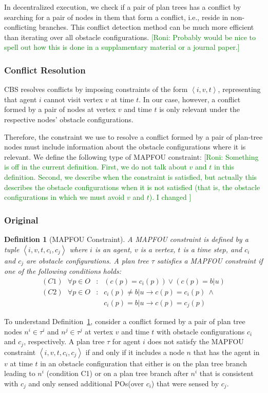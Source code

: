 \documentclass[letterpaper]{article} %
\newcommand{\unknown}{\textit{b}|\textit{u}}
\newcommand{\pos}{POs\xspace}
\newcommand{\tuple}[1]{\ensuremath{\left \langle #1 \right \rangle }}
\newcommand{\roni}[1]{{\textcolor{green}{[Roni: #1]}}}
\newtheorem{definition}{Definition}
\begin{document}
In decentralized execution, we check if a pair of plan trees has a conflict by searching for a pair of nodes in them that form a conflict, i.e., reside in non-conflicting branches. 
This conflict detection method can be much more efficient than iterating over all obstacle configurations. 
\roni{Probably would be nice to spell out how this is done in a supplamentary material or a journal paper.}

\subsubsection{Conflict Resolution}
\label{scn:conflicts-resolution}
CBS resolves conflicts by imposing constraints of the form $\tuple{i,v,t}$, representing that agent $i$ cannot visit vertex $v$ at time $t$. In our case, however, a conflict formed by a pair of nodes  at vertex $v$ and time $t$ is only relevant under the respective nodes' obstacle configurations. 

Therefore, the constraint we use to resolve a conflict formed by a pair of plan-tree nodes must include  information about the obstacle configurations where it is relevant.  
We define the following type of MAPFOU constraint:
\roni{Something is off in the current definition. First, we do not talk about $v$ and $t$ in this definition. Second, we describe when the constraint is satisfied, but actually this describes the obstacle configurations when it is not satisfied (that is, the obstacle configurations in which we must avoid $v$ and $t$). I changed }
\subsubsection{Original} 
\begin{definition}[MAPFOU Constraint]
A MAPFOU constraint is defined by a tuple $\tuple{i,v,t,c_i,c_j}$ 
where $i$ is an agent, 
$v$ is a vertex,
$t$ is a time step, 
and $c_i$ and $c_j$ are obstacle configurations. 
A plan tree $\tau$ satisfies a MAPFOU constraint if one of the following conditions holds:
\begin{eqnarray}
(C1) ~~~ \forall p\in O&:& \left(c(p)=c_i(p)\right)\vee \left(c(p)=\unknown\right) \\
(C2) ~~~ \forall p\in O&:& c_i(p)\neq\unknown \rightarrow c(p)=c_i(p) ~ \wedge  \\
 &&   c_i(p)=\unknown \rightarrow c(p)=c_j(p)
\end{eqnarray}
\label{def:mapfou-constraint}
\end{definition}
To understand Definition~\ref{def:mapfou-constraint}, consider a conflict formed by a pair of plan tree nodes
$n^i\in\tau^i$ and $n^j\in\tau^j$ at vertex $v$ and time $t$ with obstacle configurations $c_i$ and $c_j$, respectively. 
A plan tree $\tau$ for agent $i$ does not satisfy the MAPFOU constraint $\tuple{i,v,t,c_i,c_j}$ if and only if 
it includes a node $n$ that has the agent in $v$ at time $t$ in an obstacle configuration that either is on the plan tree branch leading to $n^i$ (condition C1) or on a plan tree branch after $n^i$ that is consistent with $c_j$ and only sensed additional \pos (over $c_i$) that were sensed by $c_j$.  
\end{document}
